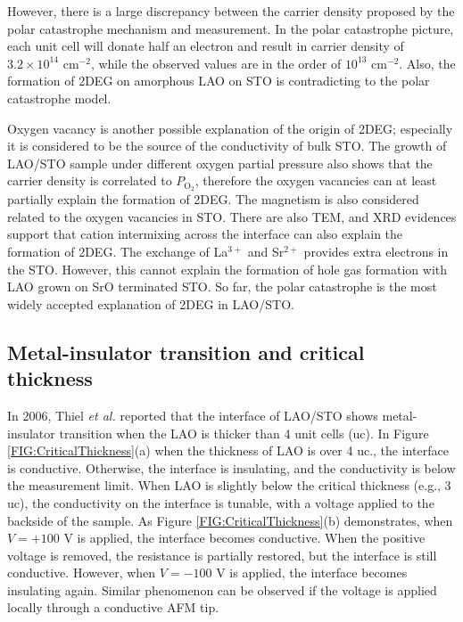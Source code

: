 \documentclass[pdflatex, sectionletters, 12pt]{pittetd}    %
\begin{document}
However, there is a large discrepancy between the carrier density proposed by the polar catastrophe mechanism and measurement. In the polar catastrophe picture, each unit cell will donate half an electron and result in carrier density of $3.2 \times 10^{14}$ cm$^{-2}$, while the observed values are in the order of $10^{13}$ cm$^{-2}$. Also, the formation of 2DEG on amorphous LAO on STO is contradicting to the polar catastrophe model. 

Oxygen vacancy is another possible explanation of the origin of 2DEG\cite{kalabukhov2007effect}; especially it is considered to be the source of the conductivity of bulk STO\cite{schooley1965dependence}. The growth of LAO/STO sample under different oxygen partial pressure also shows that the carrier density is correlated to $P_{\mathrm{O_2}}$, therefore the oxygen vacancies can at least partially explain the formation of 2DEG. The magnetism is also considered related to the oxygen vacancies in STO. There are also TEM\cite{nakagawa2006some}, and XRD\cite{willmott2007structural} evidences support that cation intermixing across the interface can also explain the formation of 2DEG. The exchange of La$^{3+}$ and Sr$^{2+}$ provides extra electrons in the STO. However, this cannot explain the formation of hole gas formation with LAO grown on SrO terminated STO. So far, the polar catastrophe is the most widely accepted explanation of 2DEG in LAO/STO.

\subsection{Metal-insulator transition and critical thickness}

In 2006, Thiel \textit{et al.} \cite{thiel2006tunable} reported that the interface of LAO/STO shows metal-insulator transition when the LAO is thicker than 4 unit cells (uc). In Figure \ref{FIG:CriticalThickness}(a) when the thickness of LAO is over 4 uc., the interface is conductive. Otherwise, the interface is insulating, and the conductivity is below the measurement limit. When LAO is slightly below the critical thickness (e.g., 3 uc), the conductivity on the interface is tunable, with a voltage applied to the backside of the sample. As Figure \ref{FIG:CriticalThickness}(b) demonstrates, when $V = +100$ V is applied, the interface becomes conductive. When the positive voltage is removed, the resistance is partially restored, but the interface is still conductive. However, when $V = -100$ V is applied, the interface becomes insulating again. Similar phenomenon can be observed if the voltage is applied locally through a conductive AFM tip. 
\end{document}
